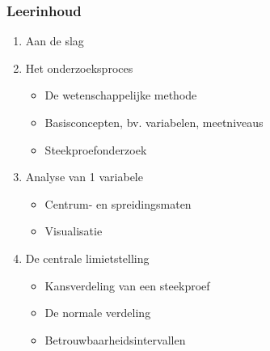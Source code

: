 \documentclass[aspectratio=169]{beamer}
\begin{document}
\begin{frame}
  \frametitle{Leerinhoud}
  
  \begin{enumerate}
    \item Aan de slag
    \item Het onderzoeksproces
    \begin{itemize}
      \item De wetenschappelijke methode
      \item Basisconcepten, bv. variabelen, meetniveaus
      \item Steekproefonderzoek
    \end{itemize}
    \item Analyse van 1 variabele
    \begin{itemize}
      \item Centrum- en spreidingsmaten
      \item Visualisatie
    \end{itemize}
    \item De centrale limietstelling
    \begin{itemize}
      \item Kansverdeling van een steekproef
      \item De normale verdeling
      \item Betrouwbaarheidsintervallen
    \end{itemize}
  \end{enumerate}

\end{frame}
\end{document}
